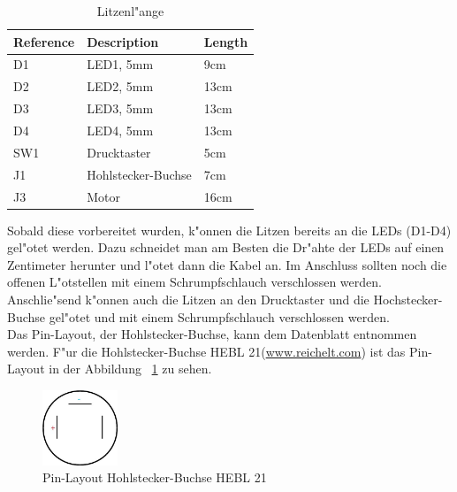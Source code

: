 \vspace{1cm}
\begin{table}[ht]
	\centering

	\begin{tabular}{ | l | l | l | } 
		\hline %
		Reference	& Description		& Length \\ 
		\hline \hline
		D1		& LED1, 5mm		& 9cm  \\
		\hline
		D2		& LED2, 5mm		& 13cm \\
		\hline
		D3		& LED3, 5mm		& 13cm \\
		\hline
		D4		& LED4, 5mm		& 13cm \\
		\hline
		SW1		& Drucktaster		& 5cm  \\
		\hline
		J1		& Hohlstecker-Buchse	& 7cm  \\
		\hline
		J3		& Motor			& 16cm \\
		\hline
	\end{tabular}

	\caption{Litzenl"ange}
	\label{table:cable}
\end{table}
\vspace{0.5cm}

Sobald diese vorbereitet wurden, k"onnen die Litzen bereits an die LEDs (D1-D4) gel"otet werden. Dazu schneidet man am Besten die Dr"ahte der LEDs auf einen Zentimeter herunter und l"otet dann die Kabel an. Im Anschluss sollten noch die offenen L"otstellen mit einem Schrumpfschlauch verschlossen werden. Anschlie"send k"onnen auch die Litzen an den Drucktaster und die Hochstecker-Buchse gel"otet und mit einem Schrumpfschlauch verschlossen werden. \\
Das Pin-Layout, der Hohlstecker-Buchse, kann dem Datenblatt entnommen werden. F"ur die Hohlstecker-Buchse \grqq HEBL 21\grqq  (\href{https://www.reichelt.com}{www.reichelt.com}) ist das Pin-Layout in der Abbildung ~\ref{fig21} zu sehen.

\vspace{1cm}
\begin{figure}[!ht]
	\centering
  	\includegraphics[width=0.2\textwidth]{pictures/hohlstecker_buchse.jpg}
	\caption{Pin-Layout Hohlstecker-Buchse \grqq HEBL 21\grqq }
	\label{fig21}
\end{figure}
\vspace{0.5cm} 


